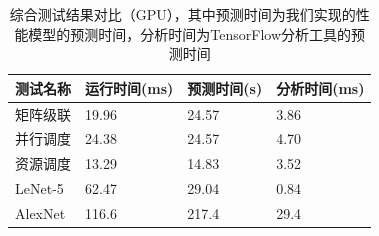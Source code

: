     \begin{table}[!htbp]
        \centering
	    \caption{综合测试结果对比（GPU），其中预测时间为我们实现的性能模型的预测时间，分析时间为TensorFlow分析工具的预测时间}
        \label{tab:cmp_gpu}
        \begin{tabular}{|l|l|l|l|}
            \hline
            测试名称 & 运行时间(ms) & 预测时间(s) & 分析时间(ms)\\
            \hline
            矩阵级联 & 19.96 & 24.57 & 3.86 \\
            \hline
            并行调度 & 24.38 & 24.57 & 4.70 \\
            \hline
            资源调度 & 13.29 & 14.83 & 3.52 \\
            \hline
            LeNet-5 & 62.47 & 29.04 & 0.84 \\
            \hline
            AlexNet & 116.6 & 217.4 & 29.4 \\
            \hline
        \end{tabular}
    \end{table}